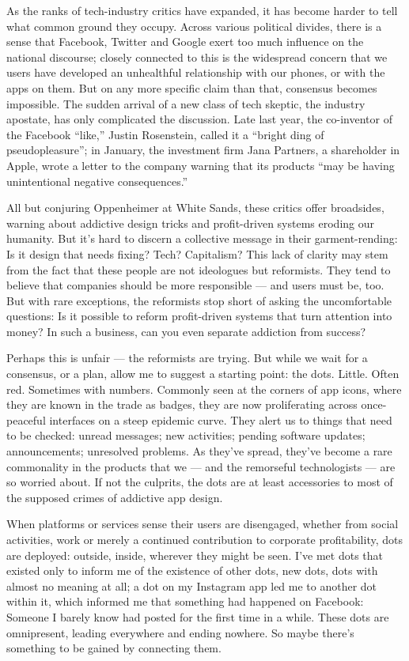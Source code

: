 As the ranks of tech-industry critics have expanded, it has become
harder to tell what common ground they occupy. Across various political
divides, there is a sense that Facebook, Twitter and Google exert too
much influence on the national discourse; closely connected to this is
the widespread concern that we users have developed an unhealthful
relationship with our phones, or with the apps on them. But on any more
specific claim than that, consensus becomes impossible. The sudden
arrival of a new class of tech skeptic, the industry apostate, has only
complicated the discussion. Late last year, the co-inventor of the
Facebook ``like,'' Justin Rosenstein, called it a ``bright ding of
pseudopleasure''; in January, the investment firm Jana Partners, a
shareholder in Apple, wrote a letter to the company warning that its
products ``may be having unintentional negative consequences.''

All but conjuring Oppenheimer at White Sands, these critics offer
broadsides, warning about addictive design tricks and profit-driven
systems eroding our humanity. But it's hard to discern a collective
message in their garment-rending: Is it design that needs fixing? Tech?
Capitalism? This lack of clarity may stem from the fact that these
people are not ideologues but reformists. They tend to believe that
companies should be more responsible --- and users must be, too. But
with rare exceptions, the reformists stop short of asking the
uncomfortable questions: Is it possible to reform profit-driven systems
that turn attention into money? In such a business, can you even
separate addiction from success?

Perhaps this is unfair --- the reformists are trying. But while we wait
for a consensus, or a plan, allow me to suggest a starting point: the
dots. Little. Often red. Sometimes with numbers. Commonly seen at the
corners of app icons, where they are known in the trade as badges, they
are now proliferating across once-peaceful interfaces on a steep
epidemic curve. They alert us to things that need to be checked: unread
messages; new activities; pending software updates; announcements;
unresolved problems. As they've spread, they've become a rare
commonality in the products that we --- and the remorseful technologists
--- are so worried about. If not the culprits, the dots are at least
accessories to most of the supposed crimes of addictive app design.

When platforms or services sense their users are disengaged, whether
from social activities, work or merely a continued contribution to
corporate profitability, dots are deployed: outside, inside, wherever
they might be seen. I've met dots that existed only to inform me of the
existence of other dots, new dots, dots with almost no meaning at all; a
dot on my Instagram app led me to another dot within it, which informed
me that something had happened on Facebook: Someone I barely know had
posted for the first time in a while. These dots are omnipresent,
leading everywhere and ending nowhere. So maybe there's something to be
gained by connecting them.

